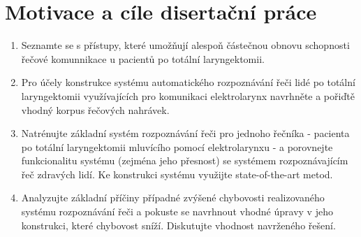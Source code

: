 \chapter{Motivace a cíle disertační práce}

\begin{enumerate}
  \item Seznamte se s přístupy, které umožňují alespoň částečnou obnovu schopnosti řečové komunnikace u pacientů po totální laryngektomii.
  \item Pro účely konstrukce systému automatického rozpoznávání řeči lidé po totální laryngektomii využívajících pro komunikaci elektrolarynx navrhněte a pořiďtě vhodný korpus řečových nahrávek.
  \item Natrénujte základní systém rozpoznávání řeči pro jednoho řečníka - pacienta po totální laryngektomii mluvícího pomocí elektrolarynxu - a porovnejte funkcionalitu systému (zejména jeho přesnost) se systémem rozpoznávajícím řeč zdravých lidí. Ke konstrukci systému využijte state-of-the-art metod.
  \item Analyzujte základní příčiny případné zvýšené chybovosti realizovaného systému rozpoznávání řeči a pokuste se navrhnout vhodné úpravy v jeho konstrukci, které chybovost sníží. Diskutujte vhodnost navrženého řešení.
\end{enumerate}
